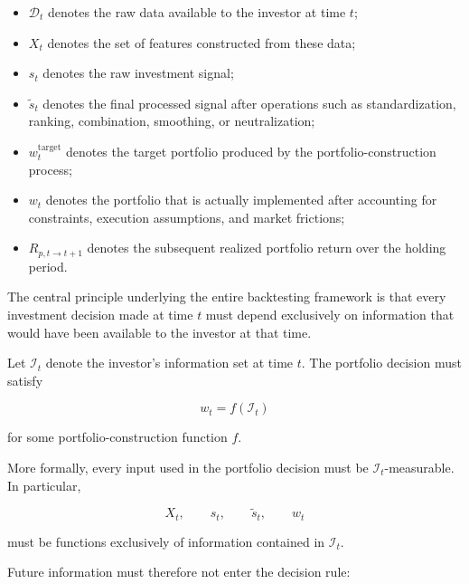 \documentclass[11pt,a4paper]{article}
\begin{document}
\begin{itemize}
    \item $\mathcal{D}_t$ denotes the raw data available to the investor at time $t$;

    \item $X_t$ denotes the set of features constructed from these data;

    \item $s_t$ denotes the raw investment signal;

    \item $\widetilde{s}_t$ denotes the final processed signal after operations
    such as standardization, ranking, combination, smoothing, or neutralization;

    \item $w_t^{\mathrm{target}}$ denotes the target portfolio produced by the
    portfolio-construction process;

    \item $w_t$ denotes the portfolio that is actually implemented after
    accounting for constraints, execution assumptions, and market frictions;

    \item $R_{p,t\rightarrow t+1}$ denotes the subsequent realized portfolio
    return over the holding period.
\end{itemize}

The central principle underlying the entire backtesting framework is that every
investment decision made at time $t$ must depend exclusively on information
that would have been available to the investor at that time.

Let $\mathcal{I}_t$ denote the investor's information set at time $t$. The
portfolio decision must satisfy

\begin{equation}
\boxed{
w_t = f(\mathcal{I}_t)
}
\end{equation}

for some portfolio-construction function $f$.

More formally, every input used in the portfolio decision must be
$\mathcal{I}_t$-measurable. In particular,

\begin{equation}
X_t,
\qquad
s_t,
\qquad
\widetilde{s}_t,
\qquad
w_t
\end{equation}

must be functions exclusively of information contained in $\mathcal{I}_t$.

Future information must therefore not enter the decision rule:
\end{document}
